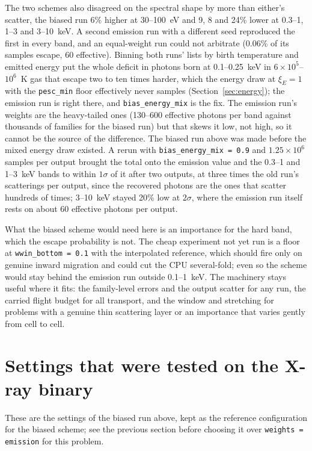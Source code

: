 \documentclass[11pt]{article}
\newcommand{\key}[1]{\texttt{#1}}
\begin{document}
The two schemes also disagreed on the spectral shape by more than either's scatter,
the biased run 6\% higher at 30--100~eV and 9, 8 and 24\% lower at 0.3--1, 1--3 and
3--10~keV. A second emission run with a different seed reproduced the first in every
band, and an equal-weight run could not arbitrate (0.06\% of its samples escape, 60
effective). Binning both runs' lists by birth temperature and emitted energy put the
whole deficit in photons born at 0.1--0.25~keV in $6\times10^5$--$10^6$~K gas that
escape two to ten times harder, which the energy draw at $\xi_E = 1$ with the
\key{pesc\_min} floor effectively never samples
(Section~\ref{sec:energy}); the emission run is right there, and
\key{bias\_energy\_mix} is the fix. The emission run's weights are the heavy-tailed ones
(130--600 effective photons per band against thousands of families for the biased run)
but that skews it low, not high, so it cannot be the source of the difference. The
biased run above was made before the mixed energy draw existed. A rerun with
\key{bias\_energy\_mix = 0.9} and $1.25\times10^6$ samples per output brought the total
onto the emission value and the 0.3--1 and 1--3~keV bands to within $1\sigma$ of it
after two outputs, at three times the old run's scatterings per output, since the
recovered photons are the ones that scatter hundreds of times; 3--10~keV stayed 20\%
low at $2\sigma$, where the emission run itself rests on about 60 effective photons per
output.

What the biased scheme would need here is an importance for the hard band, which the
escape probability is not. The cheap experiment not yet run is a floor at
\key{wwin\_bottom = 0.1} with the interpolated reference, which should fire only on
genuine inward migration and could cut the CPU several-fold; even so the scheme would
stay behind the emission run outside 0.1--1~keV. The machinery stays useful where it
fits: the family-level errors and the output scatter for any run, the carried flight
budget for all transport, and the window and stretching for problems with a genuine
thin scattering layer or an importance that varies gently from cell to cell.

\section{Settings that were tested on the X-ray binary}

These are the settings of the biased run above, kept as the reference configuration
for the biased scheme; see the previous section before choosing it over
\key{weights = emission} for this problem.
\end{document}
